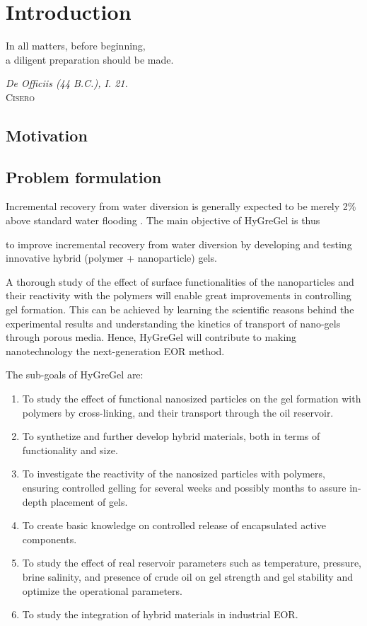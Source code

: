 \chapter{Introduction}
\vspace*{\fill}
\epigraph{In all matters, before beginning,\\ a diligent preparation should be made.}%
{\textit{De Officiis (44 B.C.), I. 21.}\\ \textsc{Cisero}}
\clearpage{\thispagestyle{empty}\cleardoublepage}
\section{Motivation}

\section{Problem formulation}

Incremental recovery from water diversion is generally expected to be merely 2\% above standard water flooding \citep{OG21}. The main objective of HyGreGel is thus 
\begin{tcolorbox}
to improve incremental recovery from water diversion by developing and testing innovative hybrid (polymer + nanoparticle) gels.
\end{tcolorbox}
A thorough study of the effect of surface functionalities of the nanoparticles and their reactivity with the polymers will enable great improvements in controlling gel formation. This can be achieved by learning the scientific reasons behind the experimental results and understanding the kinetics of transport of nano-gels through porous media. Hence,  HyGreGel will contribute to making nanotechnology the next-generation EOR method.

The sub-goals of HyGreGel are:
\begin{enumerate}
    \item To study the effect of functional nanosized particles on the gel formation with polymers by cross-linking, and their transport through the oil reservoir.
    \item To synthetize and further develop  hybrid materials, both in terms of functionality and size.
    \item To investigate the reactivity of the nanosized particles with polymers, ensuring controlled gelling for several weeks and possibly months to assure in-depth placement of gels.
    \item To create basic knowledge on controlled release of encapsulated active components.
    \item To study the effect of real reservoir parameters such as temperature, pressure, brine salinity, and presence of crude oil on gel strength and gel stability and optimize the operational parameters.
    \item To study the integration of hybrid materials in industrial EOR.
\end{enumerate}

